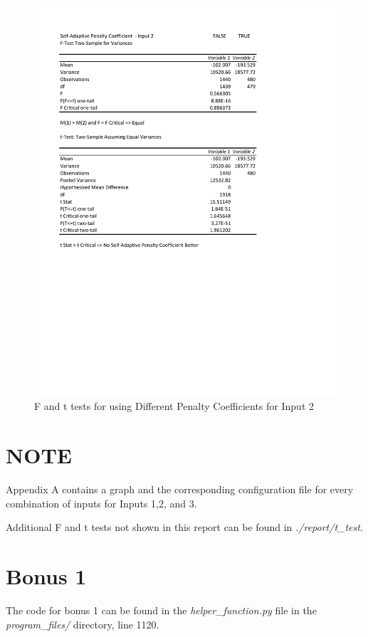 \documentclass[times]{article}
\begin{document}
	\begin{figure}
		\caption{F and t tests for using Different Penalty Coefficients for Input 2}
		\label{fig:coeff2}
		\includegraphics[width=\textwidth]{./t_test/S-APenaltyCoeff2}
	\end{figure}

	\section{NOTE}
	Appendix A contains a graph and the corresponding configuration file for every combination of inputs for Inputs 1,2, and 3.

	Additional F and t tests not shown in this report can be found in \textit{./report/t_test}.


	\section{Bonus 1}
	The code for bonus 1 can be found in the \textit{helper\_function.py} file in the \textit{program\_files/} directory, line 1120.
\end{document}
